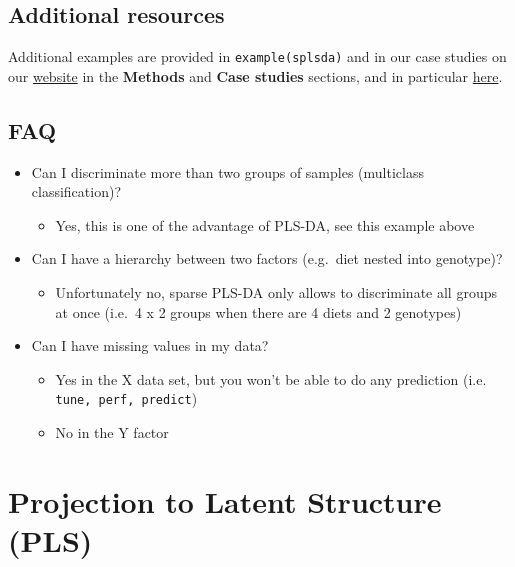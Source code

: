 \documentclass[]{book}
\providecommand{\tightlist}{%
  \setlength{\itemsep}{0pt}\setlength{\parskip}{0pt}}
\theoremstyle{definition}
\theoremstyle{definition}
\theoremstyle{definition}
\theoremstyle{remark}
\begin{document}
\section{Additional resources}\label{additional-resources-1}

Additional examples are provided in \texttt{example(splsda)} and in our
case studies on our \href{http://www.mixomics.org}{website} in the
\textbf{Methods} and \textbf{Case studies} sections, and in particular
\href{http://mixomics.org/case-studies/splsda-srbct/}{here}.

\section{FAQ}\label{faq-1}

\begin{itemize}
\tightlist
\item
  Can I discriminate more than two groups of samples (multiclass
  classification)?

  \begin{itemize}
  \tightlist
  \item
    Yes, this is one of the advantage of PLS-DA, see this example above
  \end{itemize}
\item
  Can I have a hierarchy between two factors (e.g.~diet nested into
  genotype)?

  \begin{itemize}
  \tightlist
  \item
    Unfortunately no, sparse PLS-DA only allows to discriminate all
    groups at once (i.e.~4 x 2 groups when there are 4 diets and 2
    genotypes)
  \end{itemize}
\item
  Can I have missing values in my data?

  \begin{itemize}
  \tightlist
  \item
    Yes in the X data set, but you won't be able to do any prediction
    (i.e. \texttt{tune,\ perf,\ predict})
  \item
    No in the Y factor
  \end{itemize}
\end{itemize}

\chapter{Projection to Latent Structure (PLS)}\label{pls}
\end{document}
